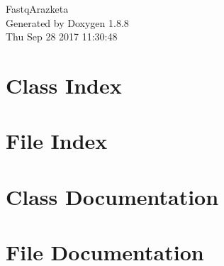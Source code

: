 \documentclass[twoside]{book}
\newcommand{\+}{\discretionary{\mbox{\scriptsize$\hookleftarrow$}}{}{}}
\newcommand{\clearemptydoublepage}{%
  \newpage{\pagestyle{empty}\cleardoublepage}%
}
\begin{document}
\hypersetup{pageanchor=false,
             bookmarks=true,
             bookmarksnumbered=true,
             pdfencoding=unicode
            }
\begin{titlepage}
\vspace*{7cm}
\begin{center}%
{\Large Fastq\+Arazketa }\\
\vspace*{1cm}
{\large Generated by Doxygen 1.8.8}\\
\vspace*{0.5cm}
{\small Thu Sep 28 2017 11:30:48}\\
\end{center}
\end{titlepage}
\clearemptydoublepage
\tableofcontents
\clearemptydoublepage
{}
\hypersetup{pageanchor=true}

\chapter{Class Index}

\chapter{File Index}

\chapter{Class Documentation}



















\chapter{File Documentation}

















































\newpage
{}
{}
\printindex
\end{document}
